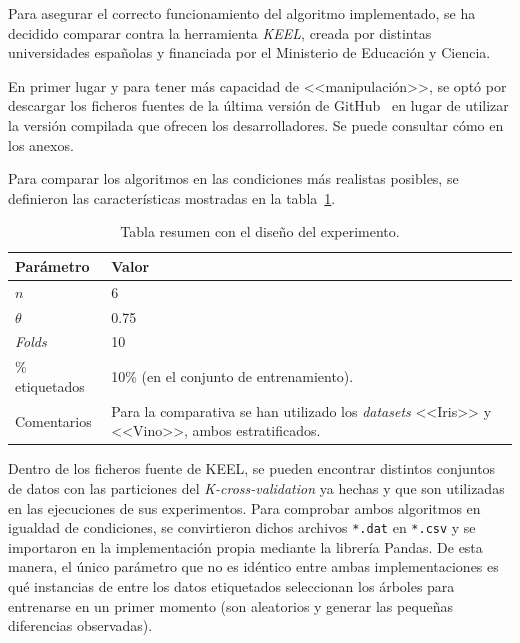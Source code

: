 Para asegurar el correcto funcionamiento del algoritmo implementado, se ha decidido comparar contra la herramienta \textit{KEEL}, creada por distintas universidades españolas y financiada por el Ministerio de Educación y Ciencia.

En primer lugar y para tener más capacidad de <<manipulación>>, se optó por descargar los ficheros fuentes de la última versión de GitHub~\cite{keelRepo} en lugar de utilizar la versión compilada que ofrecen los desarrolladores. Se puede consultar cómo en los anexos.

Para comparar los algoritmos en las condiciones más realistas posibles, se definieron las características mostradas en la tabla~\ref{tabla_coforest_keelvsnuestro_diseño}.

\begin{table}
	\begin{centering}
		\begin{tabular}{@{}p{10em} p{20em} @{}}
			\toprule
			\textbf{Parámetro} & \textbf{Valor} \\ 
			\midrule
			$n$ & 6\\
			$\theta$ & 0.75 \\
			\textit{Folds} & 10 \\
			\% etiquetados & 10\% (en el conjunto de entrenamiento). \\
			Comentarios & Para la comparativa se han utilizado los \textit{datasets} <<Iris>> y <<Vino>>, ambos estratificados.\\
			\bottomrule
			
		\end{tabular}
	\end{centering}
	\caption{Tabla resumen con el diseño del experimento.}
	\label{tabla_coforest_keelvsnuestro_diseño}	
\end{table}

Dentro de los ficheros fuente de KEEL, se pueden encontrar distintos conjuntos de datos con las particiones del \textit{K-cross-validation} ya hechas y que son utilizadas en las ejecuciones de sus experimentos. Para comprobar ambos algoritmos en igualdad de condiciones, se convirtieron dichos archivos \texttt{*.dat} en \texttt{*.csv} y se importaron en la implementación propia mediante la librería Pandas. De esta manera, el único parámetro que no es idéntico entre ambas implementaciones es qué instancias de entre los datos etiquetados seleccionan los árboles para entrenarse en un primer momento (son aleatorios y generar las pequeñas diferencias observadas).

